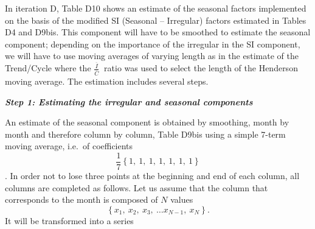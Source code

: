 \documentclass[
]{book}
\begin{document}
In iteration D, Table D10 shows an estimate of the seasonal factors
implemented on the basis of the modified SI (Seasonal -- Irregular)
factors estimated in Tables D4 and D9bis. This component will have to be
smoothed to estimate the seasonal component; depending on the importance
of the irregular in the SI component, we will have to use moving
averages of varying length as in the estimate of the Trend/Cycle where
the \(\frac{\overline{I}}{\overline{C}}\ \) ratio was used to select the
length of the Henderson moving average. The estimation includes several
steps.

\textbf{\emph{Step 1: Estimating the irregular and seasonal components}}

An estimate of the seasonal component is obtained by smoothing, month by
month and therefore column by column, Table D9bis using a simple 7-term
moving average, i.e.~of coefficients
\[\frac{1}{7} \left\{1,\ 1,\ 1,\ 1,\ 1,\ 1,\ 1\right\}\]. In order not to
lose three points at the beginning and end of each column, all columns
are completed as follows. Let us assume that the column that corresponds
to the month is composed of \(N\) values
\[
\left\{ x_{1},\ x_{2},\ x_{3},\ \ldots x_{N - 1},\ x_{N} \right\}.
\]
It
will be transformed into a series
\end{document}
